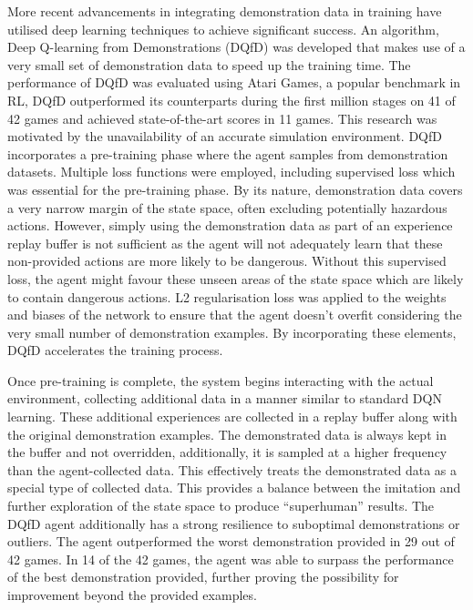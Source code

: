 
More recent advancements in integrating demonstration data in training have utilised deep learning techniques to achieve significant success\cite{deepQLearningFromDemo}.
An algorithm, Deep Q-learning from Demonstrations (DQfD) was developed that makes use of a very small set of demonstration data to speed up the training time.
The performance of DQfD was evaluated using Atari Games, a popular benchmark in RL, DQfD outperformed its counterparts during the first million stages on 41 of 42 games and achieved state-of-the-art scores in 11 games.
This research was motivated by the unavailability of an accurate simulation environment.
DQfD incorporates a pre-training phase where the agent samples from demonstration datasets.
Multiple loss functions were employed, including supervised loss which was essential for the pre-training phase.
By its nature, demonstration data covers a very narrow margin of the state space, often excluding potentially hazardous actions.
However, simply using the demonstration data as part of an experience replay buffer is not sufficient as the agent will not adequately learn that these non-provided actions are more likely to be dangerous.
Without this supervised loss, the agent might favour these unseen areas of the state space which are likely to contain dangerous actions.
L2 regularisation loss was applied to the weights and biases of the network to ensure that the agent doesn't overfit considering the very small number of demonstration examples.
By incorporating these elements, DQfD accelerates the training process.

Once pre-training is complete, the system begins interacting with the actual environment, collecting additional data in a manner similar to standard DQN learning.
These additional experiences are collected in a replay buffer along with the original demonstration examples.
The demonstrated data is always kept in the buffer and not overridden, additionally, it is sampled at a higher frequency than the agent-collected data.
This effectively treats the demonstrated data as a special type of collected data.
This provides a balance between the imitation and further exploration of the state space to produce ``superhuman'' results.
The DQfD agent additionally has a strong resilience to suboptimal demonstrations or outliers.
The agent outperformed the worst demonstration provided in 29 out of 42 games.
In 14 of the 42 games, the agent was able to surpass the performance of the best demonstration provided, further proving the possibility for improvement beyond the provided examples.

